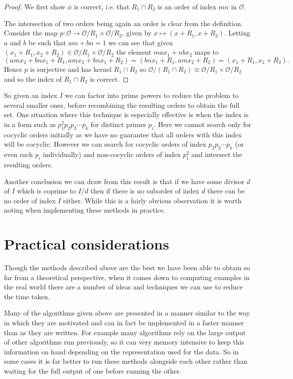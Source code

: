 \documentclass[12pt,a4paper,abstracton,bibtotoc]{scrreprt}
\theoremstyle{definition}
\renewcommand{\O}{\mathcal{O}}
\begin{document}
\begin{proof}
We first show $\phi$ is correct, i.e. that $R_1\cap R_2$ is an order of index $mn$ in $\O$.

The intersection of two orders being again an order is clear from the definition.
Consider the map $p\colon \O \to \O/R_1 \times \O/R_2$, given by $x\mapsto (x+R_1,x+R_2)$.
Letting $a$ and $b$ be such that $am + bn = 1$ we can see that given $(x_1 + R_1,x_2 + R_2)\in \O/R_1 \times \O/R_2$ the element $max_1 + nbx_2$ maps to
\[
(amx_2 + bnx_1 + R_1, amx_2 + bnx_1 + R_2) = (bnx_1 + R_1, amx_2 + R_2) = (x_1 + R_1,x_2 + R_2).
\]
Hence $p$ is surjective and has kernel $R_1 \cap R_2$ so $\O/(R_1\cap R_2) \cong \O/R_1 \times \O/R_2$ and so the index of $R_1 \cap R_2$ is correct.
\end{proof}

So given an index $I$ we can factor into prime powers to reduce the problem to several smaller ones, before recombining the resulting orders to obtain the full set.
One situation where this technique is especially effective is when the index is in a form such as $p_1^2p_2p_3\cdots p_k$ for distinct primes $p_i$.
Here we cannot search only for cocyclic orders initially as we have no guarantee that all orders with this index will be cocyclic.
However we can search for cocyclic orders of index $p_2p_3\cdots p_k$ (or even each $p_i$ individually) and non-cocyclic orders of index $p_1^2$ and intersect the resulting orders.

Another conclusion we can draw from this result is that if we have some divisor $d$ of $I$ which is coprime to $I/d$ then if there is no suborder of index $d$ there can be no order of index $I$ either.
While this is a fairly obvious observation it is worth noting when implementing these methods in practice.


\section{Practical considerations}
Though the methods described above are the best we have been able to obtain so far from a theoretical perspective, when it comes down to computing examples in the real world there are a number of ideas and techniques we can use to reduce the time taken.

Many of the algorithms given above are presented in a manner similar to the way in which they are motivated and can in fact be implemented in a faster manner than as they are written.
For example many algorithms rely on the large output of other algorithms run previously, so it can very memory intensive to keep this information on hand depending on the representation used for the data.
So in some cases it is far better to run these methods alongside each other rather than waiting for the full output of one before running the other.
\end{document}
